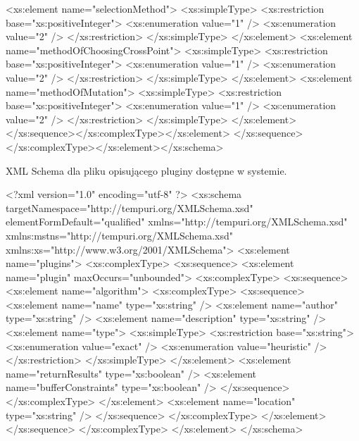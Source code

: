\begin{listing}
\begin{codeblock}
<xs:element name="selectionMethod">
<xs:simpleType>
<xs:restriction base="xs:positiveInteger">
<xs:enumeration value="1" />
<xs:enumeration value="2" />
</xs:restriction>
</xs:simpleType>
</xs:element>
<xs:element name="methodOfChoosingCrossPoint">
<xs:simpleType>
<xs:restriction base="xs:positiveInteger">
<xs:enumeration value="1" />
<xs:enumeration value="2" />
</xs:restriction>
</xs:simpleType>
</xs:element>
<xs:element name="methodOfMutation">
<xs:simpleType>
<xs:restriction base="xs:positiveInteger">
<xs:enumeration value="1" />
<xs:enumeration value="2" />
</xs:restriction>
</xs:simpleType>
</xs:element></xs:sequence></xs:complexType></xs:element>
</xs:sequence></xs:complexType></xs:element></xs:schema>
\end{codeblock}
\end{listing}

\begin{listing}
\caption{XML Schema dla pliku opisującego pluginy dostępne w systemie.}
\begin{codeblock}
<?xml version="1.0" encoding="utf-8" ?>
<xs:schema targetNamespace="http://tempuri.org/XMLSchema.xsd"
elementFormDefault="qualified"
xmlns="http://tempuri.org/XMLSchema.xsd"
xmlns:mstns="http://tempuri.org/XMLSchema.xsd"
xmlns:xs="http://www.w3.org/2001/XMLSchema">
<xs:element name="plugins">
<xs:complexType>
<xs:sequence>
<xs:element name="plugin" maxOccurs="unbounded">
<xs:complexType>
<xs:sequence>
<xs:element name="algorithm">
<xs:complexType>
<xs:sequence>
<xs:element name="name" type="xs:string" />
<xs:element name="author" type="xs:string" />
<xs:element name="description" type="xs:string" />
<xs:element name="type">
<xs:simpleType>
<xs:restriction base="xs:string">
<xs:enumeration value="exact" />
<xs:enumeration value="heuristic" />
</xs:restriction>
</xs:simpleType>
</xs:element>
<xs:element name="returnResults" type="xs:boolean" />
<xs:element name="bufferConstraints" type="xs:boolean" />
</xs:sequence>
</xs:complexType>
</xs:element>
<xs:element name="location" type="xs:string" />
</xs:sequence>
</xs:complexType>
</xs:element>
</xs:sequence>
</xs:complexType>
</xs:element>
</xs:schema>
\end{codeblock}
\end{listing}

